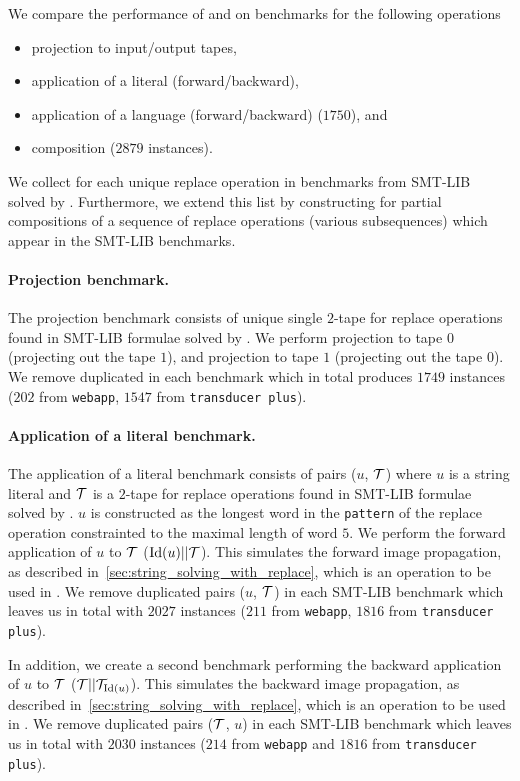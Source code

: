 We compare the performance of \mata and \mona on benchmarks for the following operations
\begin{itemize}
  \item projection to input/output tapes,
  \item application of a literal (forward/backward),
  \item application of a language (forward/backward) ($1750$), and
  \item composition ($2879$ instances).
\end{itemize}

We collect \nfts for each unique replace operation in benchmarks from SMT-LIB solved by \noodler.
Furthermore, we extend this list by constructing \nfts for partial compositions of a sequence of replace operations (various subsequences) which appear in the SMT-LIB benchmarks.

\paragraph{Projection benchmark.}
The projection benchmark consists of unique single $2$-tape \nfts for replace operations found in SMT-LIB formulae solved by \noodler.
We perform projection to tape $0$ (projecting out the tape $1$), and projection to tape $1$ (projecting out the tape $0$).
We remove duplicated \nfts in each benchmark which in total produces $1749$ instances ($202$ from \texttt{webapp}, $1547$ from \texttt{transducer plus}).

\paragraph{Application of a literal benchmark.}
The application of a literal benchmark consists of pairs ($u$, $\mathcal{T}$) where $u$ is a string literal and $\mathcal{T}$ is a $2$-tape \nft for replace operations found in SMT-LIB formulae solved by \noodler.
$u$ is constructed as the longest word in the \texttt{pattern} of the replace operation constrainted to the maximal length of word $5$.
We perform the forward application of $u$ to $\mathcal{T}$ ($\text{Id}(u) || \mathcal{T} $).
This simulates the forward image propagation, as described in~\ref{sec:string_solving_with_replace}, which is an operation to be used in \noodler.
We remove duplicated pairs ($u$, $\mathcal{T}$) in each SMT-LIB benchmark which leaves us in total with $2027$ instances ($211$ from \texttt{webapp}, $1816$ from \texttt{transducer plus}).

In addition, we create a second benchmark performing the backward application of $u$ to $\mathcal{T}$ ($ \mathcal{T} || \mathcal{T}_{\text{Id}(u)}$).
This simulates the backward image propagation, as described in~\ref{sec:string_solving_with_replace}, which is an operation to be used in \noodler.
We remove duplicated pairs ($\mathcal{T}$, $u$) in each SMT-LIB benchmark which leaves us in total with $2030$ instances ($214$ from \texttt{webapp} and $1816$ from \texttt{transducer plus}).

